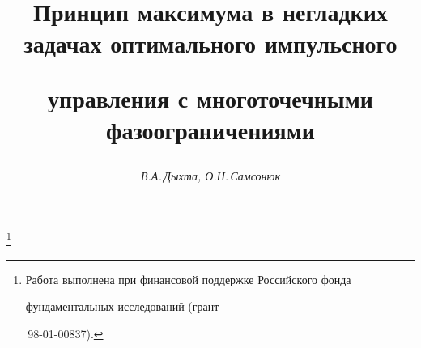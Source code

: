 




% 


\newcommand{\graph}{\operatorname{graph}}


\newcommand{\co}{\operatorname{co}}


\newcommand{\const}{\operatorname{const}}


\newcommand{\meas}{\operatorname{meas}}


\newcommand{\var}{\operatornamewithlimits{var}}


\newcommand{\ess}{\operatornamewithlimits{ess}}


\newcommand{\tts}[1]{}







\setcounter{page}{19}















\author{\it В.А.\,Дыхта, О.Н.\,Самсонюк}




\title{Принцип максимума в негладких задачах оптимального импульсного


управления с многоточечными фазоограничениями}


\thanks{Работа выполнена при финансовой поддержке Российского фонда


фундаментальных исследований (грант


\No\,98-01-00837).}





